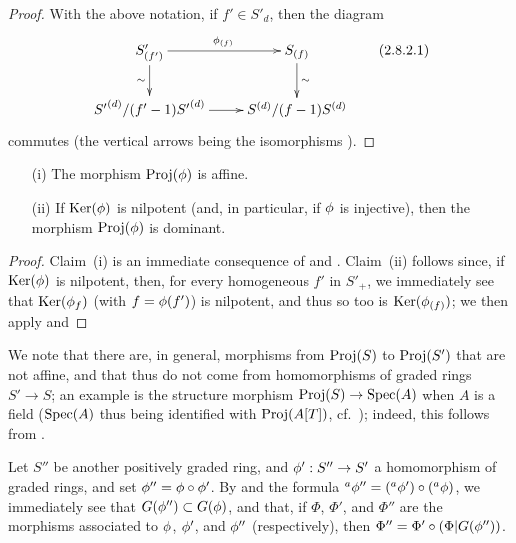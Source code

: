 \begin{proof}
With the above notation, if $f'\in S'_d$, then the diagram
\[
\label{II.2.8.2.1}
  \xymatrix{
    S'_{(f')} \ar[r]^{\vphi_{(f)}} \ar[d]_{\sim}
    & S_{(f)} \ar[d]^{\sim}
  \\{S'}^{(d)}/(f'-1){S'}^{(d)} \ar[r]
    & S^{(d)}/(f-1)S^{(d)}
  }
\tag{2.8.2.1}
\]
commutes (the vertical arrows being the isomorphisms ).
\end{proof}

\begin{corollary}[2.8.3]
\label{II.2.8.3}
\begin{enumerate}
  \item[{\rm(i)}] The morphism $\operatorname{Proj}(\phi)$ is affine.
  \item[{\rm(ii)}] If $\operatorname{Ker}(\phi)$ is nilpotent (and, in particular, if $\phi$ is injective), then the morphism $\operatorname{Proj}(\phi)$ is dominant.
\end{enumerate}
\end{corollary}

\begin{proof}
Claim~(i) is an immediate consequence of  and .
Claim~(ii) follows since, if $\operatorname{Ker}(\phi)$ is nilpotent, then, for every homogeneous $f'$ in $S'_+$, we immediately see that $\operatorname{Ker}(\phi_f)$ (with $f=\phi(f')$) is nilpotent, and thus so too is $\operatorname{Ker}(\phi_{(f)})$;
we then apply  and 
\end{proof}

We note that there are, in general, morphisms from $\operatorname{Proj}(S)$ to $\operatorname{Proj}(S')$ that are not affine, and that thus do not come from homomorphisms of graded rings $S'\to S$;
an example is the structure morphism $\Proj(S)\to\Spec(A)$ when $A$ is a field ($\operatorname{Spec}(A)$ thus being identified with $\operatorname{Proj}(A[T])$, cf.~);
indeed, this follows from .

\begin{env}[2.8.4]
\label{II.2.8.4}
Let $S''$ be another positively graded ring, and $\vphi':S''\to S'$ a homomorphism of graded rings, and set $\phi''=\phi\circ\phi'$.
By  and the formula ${}^a\phi''=({}^a\phi')\circ({}^a\phi)$, we immediately see that $G(\phi'')\subset G(\phi)$, and that, if $\Phi$, $\Phi'$, and $\Phi''$ are the morphisms associated to $\phi$, $\phi'$, and $\phi''$ (respectively), then $\Phi''=\Phi'\circ(\Phi|G(\phi''))$.
\end{env}

